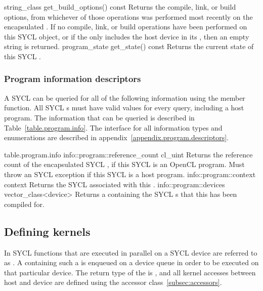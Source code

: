   \addRow
    {string_class get_build_options() const}
    {
       Returns the compile, link, or build options, from whichever of those operations was performed most recently on the encapsulated .  If no compile, link, or build operations have been performed on this SYCL  object, or if the  only includes the host device in its , then an empty string is returned.
    }
  \addRow
    {program_state get_state() const}
    {
       Returns the current state of this SYCL .
    }
\completeTable

\subsubsection{Program information descriptors}

A SYCL  can be queried for all of the following information using the  member function. All SYCL s must have valid values for every query, including a host program. The information that can be queried is described in Table~\ref{table.program.info}. The interface for all information types and enumerations are described in appendix~\ref{appendix.program.descriptors}.

{table.program.info}
\addInfoRow
    {info::program::reference_count}
    {cl_uint}
    {
      Returns the reference count of the encapsulated SYCL ,
  if this SYCL  is an OpenCL program. Must throw an  SYCL exception if this SYCL  is a host program.
    }
\addInfoRow
    {info::program::context}
    {context}
    {
      Returns the SYCL  associated with this .
    }
  \addInfoRow
    {info::program::devices}
    {vector_class<device>}
    {
      Returns a  containing the SYCL s that this  has been compiled for.
    }
\completeInfoTable

\subsection{Defining kernels}
In SYCL functions that are executed in parallel on a SYCL device are referred to
as . A  containing such a
 is enqueued on a device queue in order to be executed on
that particular device. The return type of the  is
, and all kernel accesses between host and device are defined using the
accessor class~\ref{subsec:accessors}.

